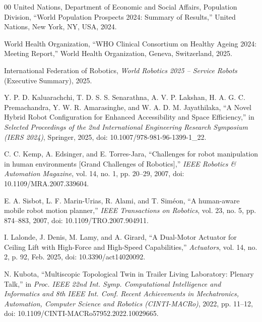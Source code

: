 \documentclass[conference]{IEEEtran}
\begin{document}
\begin{thebibliography}{00}
United Nations, Department of Economic and Social Affairs, Population Division, ``World Population Prospects 2024: Summary of Results,'' United Nations, New York, NY, USA, 2024.

World Health Organization, ``WHO Clinical Consortium on Healthy Ageing 2024: Meeting Report,'' World Health Organization, Geneva, Switzerland, 2025.

International Federation of Robotics, \textit{World Robotics 2025 -- Service Robots} (Executive Summary), 2025.

Y. P. D. Kaluarachchi, T. D. S. S. Senarathna, A. V. P. Lakshan, H. A. G. C. Premachandra, Y. W. R. Amarasinghe, and W. A. D. M. Jayathilaka, ``A Novel Hybrid Robot Configuration for Enhanced Accessibility and Space Efficiency,'' in \textit{Selected Proceedings of the 2nd International Engineering Research Symposium (IERS 2024)}, Springer, 2025, doi: 10.1007/978-981-96-1399-1\_22.

C. C. Kemp, A. Edsinger, and E. Torres-Jara, ``Challenges for robot manipulation in human environments [Grand Challenges of Robotics],'' \textit{IEEE Robotics \& Automation Magazine}, vol. 14, no. 1, pp. 20--29, 2007, doi: 10.1109/MRA.2007.339604.

E. A. Sisbot, L. F. Marin-Urias, R. Alami, and T. Sim{\'e}on, ``A human-aware mobile robot motion planner,'' \textit{IEEE Transactions on Robotics}, vol. 23, no. 5, pp. 874--883, 2007, doi: 10.1109/TRO.2007.904911.

I. Lalonde, J. Denis, M. Lamy, and A. Girard, ``A Dual-Motor Actuator for Ceiling Lift with High-Force and High-Speed Capabilities,'' \textit{Actuators}, vol. 14, no. 2, p. 92, Feb. 2025, doi: 10.3390/act14020092.

N. Kubota, ``Multiscopic Topological Twin in Trailer Living Laboratory: Plenary Talk,'' in \textit{Proc. IEEE 22nd Int. Symp. Computational Intelligence and Informatics and 8th IEEE Int. Conf. Recent Achievements in Mechatronics, Automation, Computer Science and Robotics (CINTI-MACRo)}, 2022, pp. 11--12, doi: 10.1109/CINTI-MACRo57952.2022.10029665.

\end{thebibliography}
\end{document}
